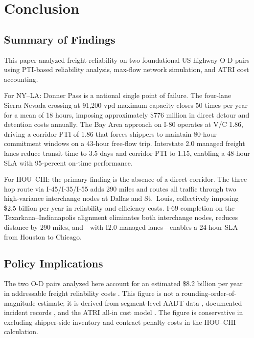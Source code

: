 \section{Conclusion}
\label{sec:conclusion}

\subsection{Summary of Findings}

This paper analyzed freight reliability on two foundational US highway O-D pairs using PTI-based reliability analysis, max-flow network simulation, and ATRI cost accounting.

For NY--LA: Donner Pass is a national single point of failure. The four-lane Sierra Nevada crossing at 91,200 vpd maximum capacity closes 50 times per year for a mean of 18 hours, imposing approximately \$776 million in direct detour and detention costs annually. The Bay Area approach on I-80 operates at V/C 1.86, driving a corridor PTI of 1.86 that forces shippers to maintain 80-hour commitment windows on a 43-hour free-flow trip. Interstate 2.0 managed freight lanes reduce transit time to 3.5 days and corridor PTI to 1.15, enabling a 48-hour SLA with 95-percent on-time performance.

For HOU--CHI: the primary finding is the absence of a direct corridor. The three-hop route via I-45/I-35/I-55 adds 290 miles and routes all traffic through two high-variance interchange nodes at Dallas and St.\ Louis, collectively imposing \$2.5 billion per year in reliability and efficiency costs. I-69 completion on the Texarkana--Indianapolis alignment eliminates both interchange nodes, reduces distance by 290 miles, and---with I2.0 managed lanes---enables a 24-hour SLA from Houston to Chicago.

\subsection{Policy Implications}

The two O-D pairs analyzed here account for an estimated \$8.2 billion per year in addressable freight reliability costs \citep{ATRI_costs2024}. This figure is not a rounding-order-of-magnitude estimate; it is derived from segment-level AADT data \citep{HPMS2018}, documented incident records \citep{Caltrans2023}, and the ATRI all-in cost model \citep{ATRI_costs2024}. The figure is conservative in excluding shipper-side inventory and contract penalty costs in the HOU--CHI calculation.

